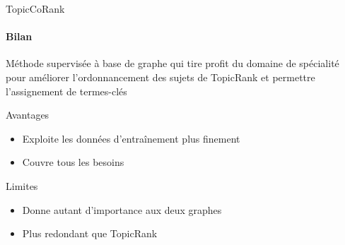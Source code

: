 \begin{frame}{TopicCoRank}\framesubtitle{Bilan}
  Méthode supervisée à base de graphe qui tire profit du domaine de spécialité
  pour améliorer l'ordonnancement des sujets de TopicRank et permettre
  l'assignement de termes-clés

  \vspace{1em}

  \begin{block}{Avantages}
    \begin{itemize}
      \item{Exploite les données d'entraînement plus finement}
      \item{Couvre tous les besoins}
    \end{itemize}
  \end{block}

  \vspace{1em}

  \begin{alertblock}{Limites}
    \begin{itemize}
      \item{Donne autant d'importance aux deux graphes}
      \item{Plus redondant que TopicRank}
    \end{itemize}
  \end{alertblock}
\end{frame}

